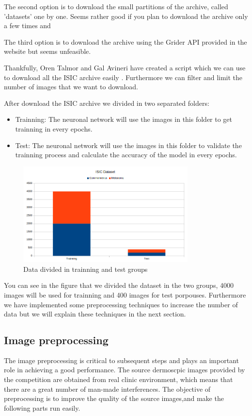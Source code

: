 The second option is to download the small partitions of the archive, called 'datasets' one by one. Seems rather good if you plan to download the archive only a few times and 

The third option is to download the archive using the Grider API provided in the website but seems unfeasible.


Thankfully, Oren Talmor and Gal Avineri have created a script which we can use to download all the ISIC archive easily \cite{isic-archive-downloader}. Furthermore we can filter and limit the number of images that we want to download.


After download the ISIC archive we divided in two separated folders:
\begin{itemize}
\item Trainning: The neuronal network will use the images in this folder to get trainning in every epochs.
\item Test: The neuronal network will use the images in this folder to validate the trainning process and calculate the accuracy of the model in every epochs.
\end{itemize}


\begin{figure}[H]
\centering
\includegraphics[width=0.8\textwidth]{./figures/dataset-plot-size}
\caption{Data divided in trainning and test groups}
\end{figure}

You can see in the figure that we divided the dataset in the two groups, 
4000 images will be used for trainning and 400 images for test porpouses.
Furthermore we have implemented some preprocessing techniques to increase the number of data but we will explain these techniques in the next section.

\subsection{Image preprocessing}
The image preprocessing is critical to subsequent steps and plays an important role in achieving a good performance. The source dermoscpic images provided by the competition are obtained from real clinic environment, which means that there are a great number of man-made interferences. The objective of preprocessing is to improve the quality of the source images,and make the following parts run easily.


